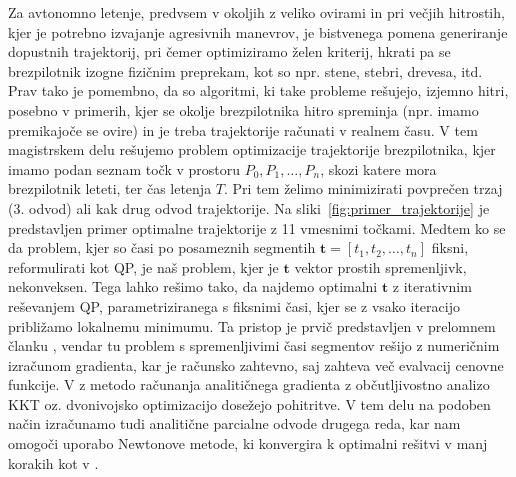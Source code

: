 \documentclass[isrm2, tisk]{fmfdelo}
\newcommand{\tvec}{\mathbf{t}}
\begin{document}
Za avtonomno letenje, predvsem v okoljih z veliko ovirami in pri večjih hitrostih, kjer je potrebno izvajanje agresivnih manevrov, je bistvenega pomena generiranje dopustnih trajektorij, pri čemer optimiziramo želen kriterij, hkrati pa se brezpilotnik izogne fizičnim preprekam, kot so npr. stene, stebri, drevesa, itd. Prav tako je pomembno, da so algoritmi, ki take probleme rešujejo, izjemno hitri, posebno v primerih, kjer se okolje brezpilotnika hitro spreminja (npr. imamo premikajoče se ovire) in je treba trajektorije računati v realnem času. 
V tem magistrskem delu rešujemo problem optimizacije trajektorije brezpilotnika, kjer imamo podan seznam točk v prostoru $P_0, P_1, \ldots, P_n$, skozi katere mora brezpilotnik leteti, ter čas letenja $T$. Pri tem želimo minimizirati povprečen trzaj (3. odvod) ali kak drug odvod trajektorije. Na sliki~\ref{fig:primer_trajektorije} je predstavljen primer optimalne trajektorije z 11 vmesnimi točkami. Medtem ko se da problem, kjer so časi po posameznih segmentih $\tvec = \left[ t_1, t_2, \ldots, t_n \right]$ fiksni, reformulirati kot \ac{QP}, je naš problem, kjer je $\tvec$ vektor prostih spremenljivk, nekonveksen. Tega lahko rešimo tako, da najdemo optimalni $\tvec$ z iterativnim reševanjem \ac{QP}, parametriziranega s fiksnimi časi, kjer se z vsako iteracijo približamo lokalnemu minimumu. Ta pristop je prvič predstavljen v prelomnem članku \cite{mellinger2011minimum}, vendar tu problem s spremenljivimi časi segmentov rešijo z numeričnim izračunom gradienta, kar je računsko zahtevno, saj zahteva več evalvacij cenovne funkcije. V \cite{sun2021fast} z metodo računanja analitičnega gradienta z občutljivostno analizo \ac{KKT} oz. dvonivojsko optimizacijo dosežejo pohitritve. V tem delu na podoben način izračunamo tudi analitične parcialne odvode drugega reda, kar nam omogoči uporabo Newtonove metode, ki konvergira k optimalni rešitvi v manj korakih kot v \cite{sun2021fast}.
\end{document}
